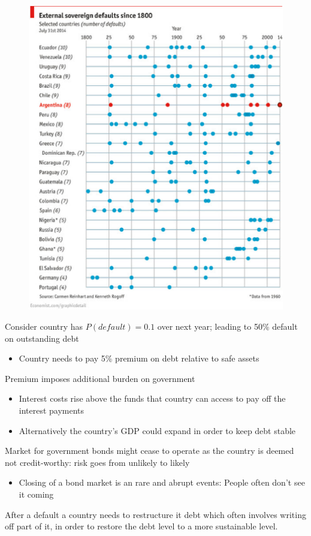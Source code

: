 \documentclass{beamer}
\begin{document}
\begin{frame}
  \begin{figure}
    \includegraphics[scale=.5]{defaults.eps}
  \end{figure}
\end{frame}

\begin{frame}
  Consider country has $P(default)=0.1$ over next year; leading to 50\% default on outstanding debt
  \begin{itemize}
    \item Country needs to pay 5\% premium on debt relative to safe assets
  \end{itemize}
  \medskip
  Premium imposes additional burden on government
  \begin{itemize}
    \item Interest costs rise above the funds that country can access to pay off the interest payments
    \item Alternatively the country's GDP could expand in order to keep debt stable
  \end{itemize}
  Market for government bonds might cease to operate as the country is deemed not credit-worthy: risk goes from unlikely to likely
  \begin{itemize}
    \item Closing of a bond market is an rare and abrupt events: People often don't see it coming
  \end{itemize}
  After a default a country needs to restructure it debt which often involves writing off part of it, in order to restore the debt level to a more sustainable level. 
\end{frame}
\end{document}
